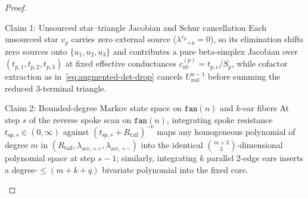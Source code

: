 \begin{proof}\leavevmode
\begin{proofpart}{Claim 1: Unsourced star--triangle Jacobian and Schur cancellation}
Each unsourced star $v_p$ carries zero external source ($\lambda^{v_p}{}_{+\dot{a}} = 0$), so its elimination shifts zero sources onto $\{u_1,u_2,u_3\}$ and contributes a pure beta-simplex Jacobian over $(t_{p,1},t_{p,2},t_{p,3})$ at fixed effective conductances $c_{ab}^{(p)} = t_{p,c}/S_p$, while cofactor extraction as in~\eqref{eq:augmented-det-drop} cancels $U_{\mathrm{red}}^{n-1}$ before summing the reduced $3$-terminal triangle.
\end{proofpart}
\begin{proofpart}{Claim 2: Bounded-degree Markov state space on $\texttt{fan}(n)$ and $k$-ear fibers}
At step $s$ of the reverse spoke scan on $\texttt{fan}(n)$, integrating spoke resistance $t_{\mathrm{sp},s} \in (0,\infty)$ against $(t_{\mathrm{sp},s} + R_{\mathrm{tail}})^{-\nu}$ maps any homogeneous polynomial of degree $m$ in $(R_{\mathrm{tail}}, \lambda_{\mathrm{acc},+\dot{+}}, \lambda_{\mathrm{acc},+\dot{-}})$ into the identical $\binom{m+3}{3}$-dimensional polynomial space at step $s-1$; similarly, integrating $k$ parallel $2$-edge ears inserts a degree-$\le(m+k+q)$ bivariate polynomial into the fixed core.
\end{proofpart}
\end{proof}

